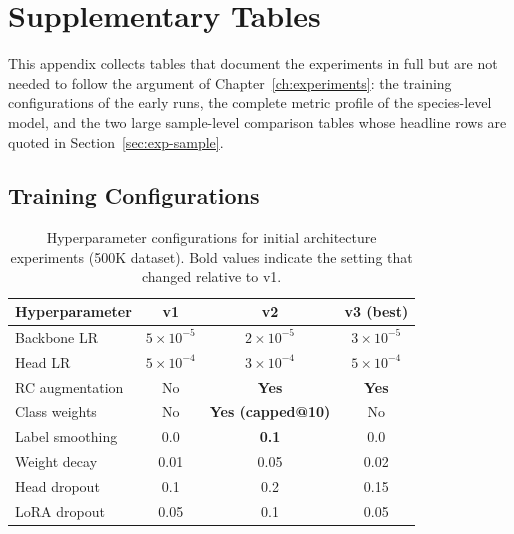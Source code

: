 
\chapter{Supplementary Tables}
\label{app:tables}

This appendix collects tables that document the experiments in full but are not
needed to follow the argument of Chapter~\ref{ch:experiments}: the training
configurations of the early runs, the complete metric profile of the
species-level model, and the two large sample-level comparison tables whose
headline rows are quoted in Section~\ref{sec:exp-sample}.

\section{Training Configurations}
\label{app:configs}

\begin{table}[htbp]
    \centering
    \caption{Hyperparameter configurations for initial architecture experiments (500K dataset). Bold values indicate the setting that changed relative to v1.}
    \label{tab:v1-v3-configs}
    \begin{tabular}{lccc}
        \toprule
        \textbf{Hyperparameter} & \textbf{v1} & \textbf{v2} & \textbf{v3 (best)} \\
        \midrule
        Backbone LR & $5 \times 10^{-5}$ & $2 \times 10^{-5}$ & $3 \times 10^{-5}$ \\
        Head LR & $5 \times 10^{-4}$ & $3 \times 10^{-4}$ & $5 \times 10^{-4}$ \\
        RC augmentation & No & \textbf{Yes} & \textbf{Yes} \\
        Class weights & No & \textbf{Yes (capped@10)} & No \\
        Label smoothing & 0.0 & \textbf{0.1} & 0.0 \\
        Weight decay & 0.01 & 0.05 & 0.02 \\
        Head dropout & 0.1 & 0.2 & 0.15 \\
        LoRA dropout & 0.05 & 0.1 & 0.05 \\
        \bottomrule
    \end{tabular}
\end{table}

